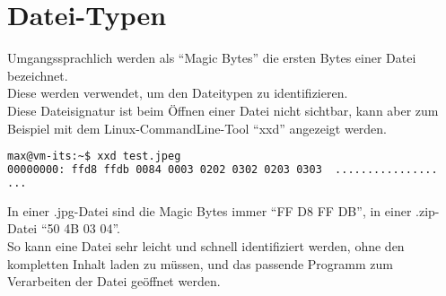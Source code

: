 \section{Datei-Typen}\label{sec:datei-typen}

Umgangssprachlich werden als "`Magic Bytes"' die ersten Bytes einer Datei bezeichnet.\\
Diese werden verwendet, um den Dateitypen zu identifizieren.\\

Diese Dateisignatur ist beim Öffnen einer Datei nicht sichtbar, kann aber zum Beispiel mit dem Linux-CommandLine-Tool "`xxd"' angezeigt werden.\\

\begin{lstlisting}[language=Bash, caption=Magic Bytes XXD,label={lst:lstlisting}]
max@vm-its:~$ xxd test.jpeg
00000000: ffd8 ffdb 0084 0003 0202 0302 0203 0303  ................
...
\end{lstlisting}
\vspace{5mm}

In einer .jpg-Datei sind die Magic Bytes immer "`FF D8 FF DB"', in einer .zip-Datei "`50 4B 03 04"'.\\
So kann eine Datei sehr leicht und schnell identifiziert werden, ohne den kompletten Inhalt laden zu müssen, und das passende Programm zum Verarbeiten der Datei geöffnet werden.
